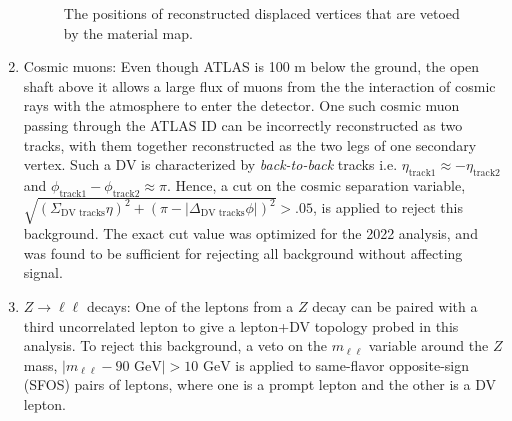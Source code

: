 \begin{enumerate}
    \begin{figure}[!ht]
        \centering
        \caption{The positions of reconstructed displaced vertices that are vetoed by the material map.~\cite{SUSY-2018-13}}
        \label{fig:material_map}
    \end{figure}

    \item Cosmic muons: Even though ATLAS is 100 m below the ground, the open shaft above it allows a large flux of muons from the the interaction of cosmic rays with the atmosphere to enter the detector. One such cosmic muon passing through the ATLAS ID can be incorrectly reconstructed as two tracks, with them together reconstructed as the two legs of one secondary vertex. Such a DV is characterized by \textit{back-to-back} tracks i.e. $\eta_\mathrm{track1}\approx-\eta_\mathrm{track2}$ and $\phi_\mathrm{track1}-\phi_\mathrm{track2}\approx\pi$. Hence, a cut on the cosmic separation variable, $\sqrt{(\Sigma_\text{DV tracks}\eta)^2+(\pi-|\Delta_\text{DV tracks}\phi|)^2}>.05$, is applied to reject this background. The exact cut value was optimized for the 2022 analysis, and was found to be sufficient for rejecting all background without affecting signal.

    \item $Z\to\ell\ell$ decays: One of the leptons from a $Z$ decay can be paired with a third uncorrelated lepton to give a lepton+DV topology probed in this analysis. To reject this background, a veto on the $m_{\ell\ell}$ variable around the $Z$ mass, $|m_{\ell\ell}-90\text{ GeV}|>10\text{ GeV}$ is applied to same-flavor opposite-sign (SFOS) pairs of leptons, where one is a prompt lepton and the other is a DV lepton.
\end{enumerate}

